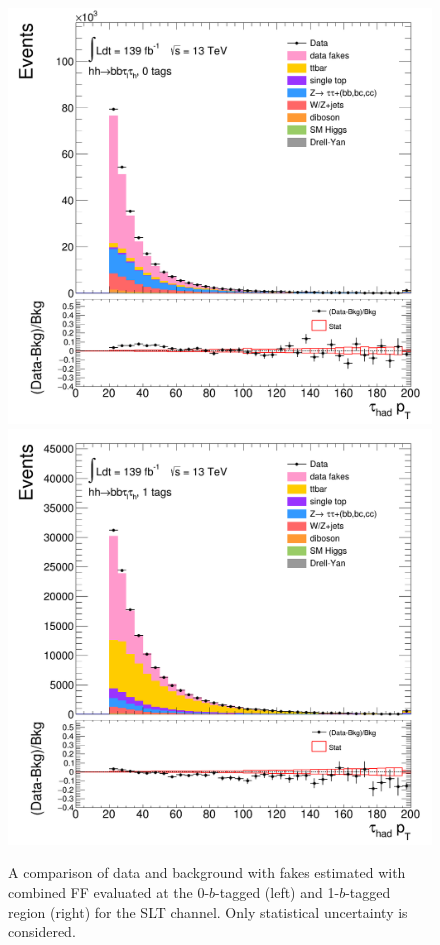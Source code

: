 \begin{figure}[htbp]
\centering
\includegraphics[width=.4\textwidth]{DiHiggs/plots/FF_CRs/SR_SLT_datafakes/HNone/BDTVarsHighMbb/0/C_0tag2pjet_0ptv_TauPt.png}
\includegraphics[width=.4\textwidth]{DiHiggs/plots/FF_CRs/SR_SLT_datafakes/HNone/BDTVarsHighMbb/1/C_1tag2pjet_0ptv_TauPt.png} \\
\caption{A comparison of data and background with fakes estimated with combined FF evaluated at the 0-$b$-tagged (left) 
and 1-$b$-tagged region (right) for the SLT channel.
Only statistical uncertainty is considered. }
\label{fig:FFVRSLT}
\end{figure}


